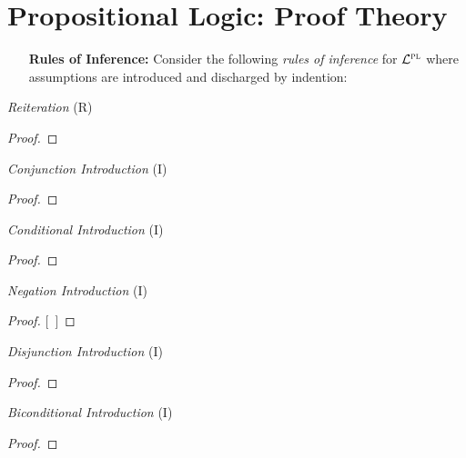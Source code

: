\documentclass[a4paper, 11pt]{article} %
\begin{document}
\section*{\sc Propositional Logic: Proof Theory}

\begin{enumerate}[leftmargin=1.2in,labelsep=.15in] %
  \item[\bf Rules of Inference:] Consider the following \textit{rules of inference} for $\mathcal{L}^{\textsc{pl}}$ where assumptions are introduced and discharged by indention:
\end{enumerate}

\begin{multicols}{2}\footnotesize

  \textit{Reiteration} (R)
  \begin{proof}
     
  \end{proof}
  \medskip

  \textit{Conjunction Introduction} (\eand I)
  \begin{proof}
     
     
  \end{proof}
  \medskip

  \textit{Conditional Introduction} (\eif I)
  \begin{proof}
    \open
    \close
  \end{proof}
  \medskip

  \textit{Negation Introduction} (\enot I)
  \begin{proof}
  \open
    \metaA {}   %
    \metaB
  \close
  [\ ]{\enot\metaA}
  \end{proof}
  \medskip

  \textit{Disjunction Introduction} (\eor I)
  \begin{proof}
  \end{proof}
  \medskip

  \textit{Biconditional Introduction} (\eiff I)
  \begin{proof}
    \open
       
    \close
  \breakline
    \open
       
    \close
  \end{proof}
  \medskip


\end{multicols}
\end{document}
